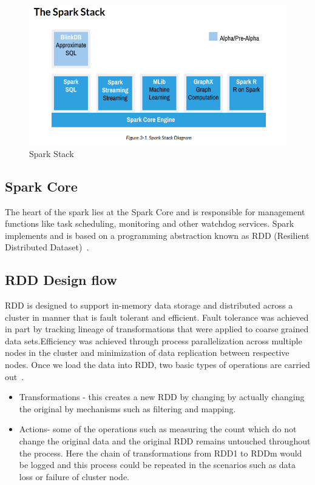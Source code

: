\begin{figure}[!ht]
  \centering\includegraphics[width=\columnwidth]{images/spark-stack.png}
   \caption{Spark Stack 
   ~\cite{hid-sp18-410-spark-architecture}}\label{fig:spark-stack}
\end{figure}




\subsection{Spark Core}

The heart of the spark lies at the Spark Core and is responsible for management 
functions like task scheduling, monitoring and other watchdog services. 
Spark implements and is based on a programming abstraction known as 
RDD (Resilient Distributed Dataset)~\cite{hid-sp18-410-spark-architecture}.



\subsection{RDD Design flow}

RDD is designed to support in-memory data storage and distributed across a 
cluster in manner that is   fault tolerant and efficient. Fault tolerance was 
achieved in part by tracking lineage of transformations that were applied to 
coarse grained data sets.Efficiency was achieved through process parallelization
 across multiple nodes in the cluster and minimization of data replication 
 between respective nodes.
Once we load the data into RDD, two basic types of operations 
are carried out~\cite{hid-sp18-410-spark-RDD}.

\begin{itemize}

\item Transformations - this creates a new RDD by changing by actually changing the 
original by mechanisms such as filtering and mapping.

\item Actions- some of the operations such as measuring the count which do not change 
the original data and the original RDD remains untouched throughout the process.
 Here the chain of transformations from RDD1 to RDDm would be logged and this 
 process could be repeated in the scenarios such as data loss or failure of 
 cluster node.

\end{itemize}

